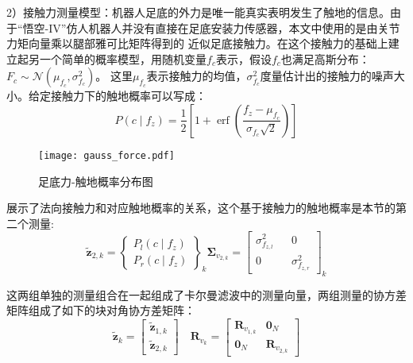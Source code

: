 2）接触力测量模型：机器人足底的外力是唯一能真实表明发生了触地的信息。由于“悟空-IV”仿人机器人并没有直接在足底安装力传感器，本文中使用的是由关节力矩向量乘以腿部雅可比矩阵得到的
近似足底接触力。在这个接触力的基础上建立起另一个简单的概率模型，用随机变量$f_c$表示，假设$f_c$也满足高斯分布：$F_c \sim \mathcal{N}\left(\mu_{f_c}, \sigma_{f_c}^2\right)$。
这里$\mu_{f_c}$表示接触力的均值，$\sigma_{f_c}^2$度量估计出的接触力的噪声大小。给定接触力下的触地概率可以写成：
\begin{equation}
    \label{equ:est_force_prob}
    P\left(c \mid f_z\right)=\frac{1}{2}\left[1+\operatorname{erf}\left(\frac{f_z-\mu_{f_c}}{\sigma_{f_c} \sqrt{2}}\right)\right]
\end{equation}
\begin{figure}[htbp]
    \centering
    \texttt{[image: gauss\_force.pdf]}
    \caption{\label{fig:gauss_force}足底力-触地概率分布图}
\end{figure}

展示了法向接触力和对应触地概率的关系，这个基于接触力的触地概率是本节的第二个测量:
\begin{equation}
    \label{equ:est_force_noise}
    \tilde{\boldsymbol{z}}_{2, k}=\left\{\begin{array}{c}
        P_l\left(c \mid f_z\right) \\
        P_r\left(c \mid f_z\right)
        \end{array}\right\}_k \boldsymbol{\Sigma}_{v_{2, k}}=\left[\begin{array}{ccc}
        \sigma_{f_{z, l}}^2 & & 0 \\
        0 & & \sigma_{f_{z, r}}^2
        \end{array}\right]_k
\end{equation}

这两组单独的测量组合在一起组成了卡尔曼滤波中的测量向量，两组测量的协方差矩阵组成了如下的块对角协方差矩阵：
\begin{equation}
    \label{equ:est_h_and_f}
    \tilde{\boldsymbol{z}}_k=\left[\begin{array}{c}
        \tilde{\boldsymbol{z}}_{1, k} \\
        \tilde{\boldsymbol{z}}_{2, k}
        \end{array}\right] \quad \boldsymbol{R}_{v_k}=\left[\begin{array}{cc}
        \boldsymbol{R}_{v_{1, k}} & \mathbf{0}_N \\
        \mathbf{0}_N & \boldsymbol{R}_{v_{2, k}}
        \end{array}\right]
\end{equation}

